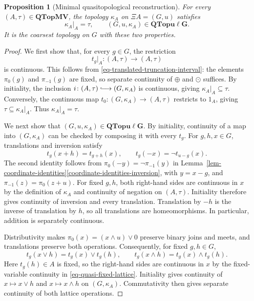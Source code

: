 \documentclass[preprint,3p]{elsarticle}
\theoremstyle{plain}
\newtheorem{prop}[thm]{Proposition}
\theoremstyle{definition}
\newcommand{\longhookrightarrow}{\lhook\joinrel\longrightarrow}
\newcommand{\QTopMV}{\mathbf{QTopMV}}
\newcommand{\QTopulg}{\mathbf{QTopu\ell G}}
\numberwithin{equation}{section}
\begin{document}
\begin{prop}[Minimal quasitopological reconstruction]
\label{thm-quasi-minimal-reconstruction}
For every $(A,\tau)\in\QTopMV$, the topology $\kappa_A$ on
$\Xi A=(G,u)$ satisfies
\begin{equation}
\label{eq-quasi-minimal-exactness}
 \kappa_A|_A=\tau,
 \qquad (G,u,\kappa_A)\in\QTopulg.
\end{equation}
It is the coarsest topology on $G$ with these two properties.
\end{prop}

\begin{proof}
We first show that, for every $g\in G$, the restriction
\[
 t_g|_A\colon(A,\tau)\longrightarrow(A,\tau)
\]
is continuous.  This follows from
\eqref{eq-translated-truncation-interval}: the elements $\pi_0(g)$
and $\pi_{-1}(g)$ are fixed, so separate continuity of $\oplus$
and $\odot$ suffices.
By initiality, the inclusion
$i\colon(A,\tau)\longhookrightarrow(G,\kappa_A)$ is continuous,
giving $\kappa_A|_A\subseteq\tau$.  Conversely, the continuous
map $t_0\colon(G,\kappa_A)\longrightarrow(A,\tau)$ restricts to
$1_A$, giving $\tau\subseteq\kappa_A|_A$.
Thus $\kappa_A|_A=\tau$.

We next show that $(G,u,\kappa_A)\in\QTopulg$.
By initiality, continuity of a map into $(G,\kappa_A)$ can be
checked by composing it with every $t_g$.
For $g,h,x\in G$, translations and inversion satisfy
\begin{equation}
\label{eq-translated-truncation-symmetries}
 t_g(x+h)=t_{g+h}(x),
 \qquad t_g(-x)=\neg t_{u-g}(x).
\end{equation}
The second identity follows from
$\pi_0(-y)=\neg\pi_{-1}(y)$ in
Lemma~\ref{lem-coordinate-identities}\ref{coordinate-identities-inversion}, with $y=x-g$, and
$\pi_{-1}(z)=\pi_0(z+u)$.
For fixed $g,h$, both right-hand sides are continuous in $x$
by the definition of $\kappa_A$ and continuity of negation on
$(A,\tau)$.  Initiality therefore gives continuity of inversion
and every translation.  Translation by $-h$ is the inverse of
translation by $h$, so all translations are homeomorphisms.
In particular, addition is separately continuous.

Distributivity makes $\pi_0(x)=(x\wedge u)\vee0$ preserve binary
joins and meets, and translations preserve both operations.
Consequently, for fixed $g,h\in G$,
\begin{equation}
\label{eq-translated-truncation-lattice}
 t_g(x\vee h)=t_g(x)\vee t_g(h),
 \qquad t_g(x\wedge h)=t_g(x)\wedge t_g(h).
\end{equation}
Here $t_g(h)\in A$ is fixed, so the right-hand sides are continuous
in $x$ by the fixed-variable continuity in
\eqref{eq-quasi-fixed-lattice}.  Initiality gives continuity of
$x\mapsto x\vee h$ and $x\mapsto x\wedge h$ on $(G,\kappa_A)$.
Commutativity then gives separate continuity of both lattice
operations.


\end{proof}
\end{document}
